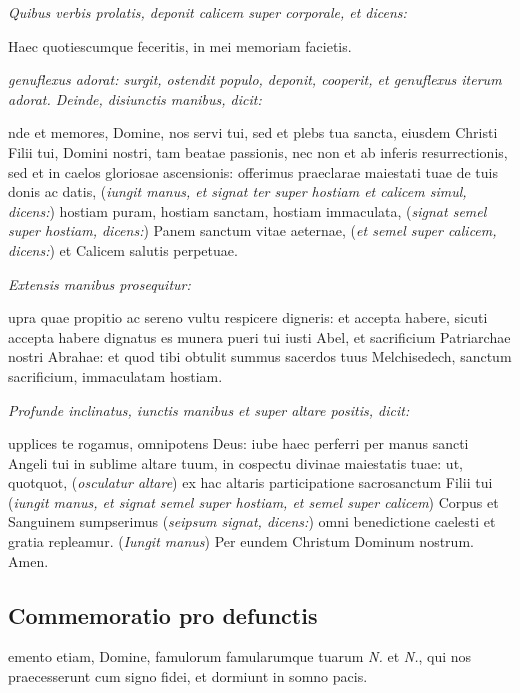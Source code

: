 \textit{Quibus verbis prolatis, deponit calicem super corporale, et dicens:}

{\Large\centering Haec quotiescumque feceritis, in mei memoriam facietis.\par}

\textit{%
    genuflexus adorat: surgit, ostendit populo, deponit, cooperit, et genuflexus
    iterum adorat.  Deinde, disiunctis manibus, dicit:
}

nde et memores, Domine, nos servi tui, sed et plebs tua sancta,
eiusdem Christi Filii tui, Domini nostri, tam beatae passionis, nec non et ab
inferis resurrectionis, sed et in caelos gloriosae ascensionis: offerimus
praeclarae maiestati tuae de tuis donis ac datis, (\textit{iungit manus, et
signat ter super hostiam et calicem simul, dicens:}) hostiam \cross{} puram,
hostiam \cross{} sanctam, hostiam \cross{} immaculata, (\textit{signat semel
super hostiam, dicens:}) Panem \cross{} sanctum vitae aeternae, (\textit{et
semel super calicem, dicens:}) et Calicem \cross{} salutis perpetuae.

\textit{Extensis manibus prosequitur:}

upra quae propitio ac sereno vultu respicere digneris: et accepta
habere, sicuti accepta habere dignatus es munera pueri tui iusti Abel, et
sacrificium Patriarchae nostri Abrahae: et quod tibi obtulit summus sacerdos
tuus Melchisedech, sanctum sacrificium, immaculatam hostiam.

\textit{Profunde inclinatus, iunctis manibus et super altare positis, dicit:}

upplices te rogamus, omnipotens Deus: iube haec perferri per manus
sancti Angeli tui in sublime altare tuum, in cospectu divinae maiestatis tuae:
ut, quotquot, (\textit{osculatur altare}) ex hac altaris participatione
sacrosanctum Filii tui (\textit{iungit manus, et signat semel super hostiam, et
semel super calicem}) Cor\cross{}pus et San\cross{}guinem sumpserimus
(\textit{seipsum signat, dicens:}) omni benedictione caelesti et gratia
repleamur.  (\textit{Iungit manus}) Per eundem Christum Dominum nostrum.  Amen.

\subsection{Commemoratio pro defunctis}

emento etiam, Domine, famulorum famularumque tuarum \textit{N.} et
\textit{N.}, qui nos praecesserunt cum signo fidei, et dormiunt in somno pacis.

